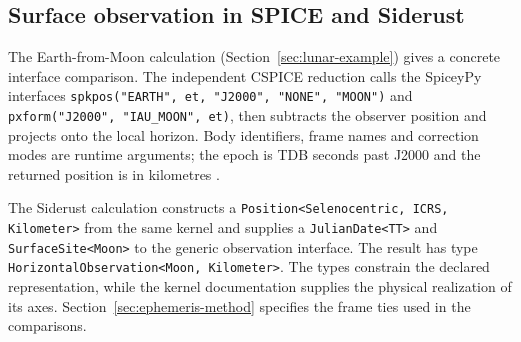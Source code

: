 \subsection{Surface observation in SPICE and Siderust}

The Earth-from-Moon calculation (Section~\ref{sec:lunar-example}) gives a concrete interface
comparison. The independent CSPICE reduction calls the SpiceyPy interfaces
\verb|spkpos("EARTH", et, "J2000", "NONE", "MOON")| and \verb|pxform("J2000", "IAU_MOON", et)|,
then subtracts the observer position and projects onto the local horizon. Body identifiers, frame
names and correction modes are runtime arguments; the epoch is TDB seconds past J2000 and the
returned position is in kilometres \cite{spkposAPI}.

The Siderust calculation constructs a \texttt{Position<Selenocentric, ICRS, Kilometer>} from the
same kernel and supplies a \texttt{JulianDate<TT>} and \texttt{SurfaceSite<Moon>} to the generic
observation interface. The result has type \texttt{HorizontalObservation<Moon, Kilometer>}. The
types constrain the declared representation, while the kernel documentation supplies the physical
realization of its axes. Section~\ref{sec:ephemeris-method} specifies the frame ties used in the
comparisons.
